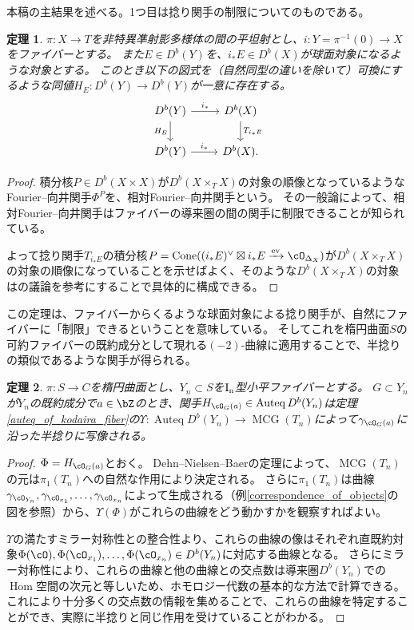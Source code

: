 \documentclass[uplatex,a4paper,dvipdfmx]{jsarticle}
\theoremstyle{plain}
\newtheorem{theorem}{定理}[section]
\theoremstyle{definition}
\DeclareMathOperator{\Hom}{\mathrm{Hom}}
\DeclareMathOperator{\Auteq}{\mathrm{Auteq}}
\DeclareMathOperator{\Cone}{\mathrm{Cone}}
\DeclareMathOperator{\ev}{\mathrm{ev}}
\DeclareMathOperator{\MCG}{\mathrm{MCG}}
\begin{document}
本稿の主結果を述べる。1つ目は捻り関手の制限についてのものである。
\begin{theorem}
	$\pi \colon X \to T$を非特異凖射影多様体の間の平坦射とし、$i \colon Y = \pi^{-1}(0) \to X$をファイバーとする。
	また$E \in D^b(Y)$を、$i_*E \in D^b(X)$が球面対象になるような対象とする。
	このとき以下の図式を（自然同型の違いを除いて）可換にするような同値$H_E \colon D^b(Y) \to D^b(Y)$が一意に存在する。
	\begin{equation}
		\begin{tikzcd}
			D^b(Y) \arrow[r,"i_*"]\arrow[d, "H_E"'] & D^b(X) \arrow[d,"T_{i_*E}"]\\
			D^b(Y) \arrow[r, "i_*"]& D^b(X).
		\end{tikzcd}
	\end{equation}
\end{theorem}
\begin{proof}
	積分核$P \in D^b(X \times X)$が$D^b(X \times_T X)$の対象の順像となっているようなFourier--向井関手$\Phi^P$を、相対Fourier--向井関手という。
	その一般論によって、相対Fourier--向井関手はファイバーの導来圏の間の関手に制限できることが知られている。

	よって捻り関手$T_{i_*E}$の積分核$P = \Cone((i_*E)^\vee \boxtimes i_*E \xrightarrow{\ev} \cO_{\Delta_X})$が$D^b(X \times_T X)$の対象の順像になっていることを示せばよく、そのような$D^b(X \times_T X)$の対象は\cite{MR2200048}の議論を参考にすることで具体的に構成できる。
\end{proof}
この定理は、ファイバーからくるような球面対象による捻り関手が、自然にファイバーに「制限」できるということを意味している。
そしてこれを楕円曲面$S$の可約ファイバーの既約成分として現れる$(-2)$-曲線に適用することで、半捻りの類似であるような関手が得られる。
\begin{theorem}
	$\pi \colon S \to C$を楕円曲面とし、$Y_n \subset S$を$\rm{I}_n$型小平ファイバーとする。
	$G \subset Y_n$が$Y_n$の既約成分で$a \in \bZ$のとき、関手$H_{\cO_G(a)} \in \Auteq D^b(Y_n)$は定理\ref{auteq_of_kodaira_fiber}の$\Upsilon \colon \Auteq D^b(Y_n) \to \MCG(T_n)$によって$\gamma_{\cO_G(a)}$に沿った半捻りに写像される。
\end{theorem}
\begin{proof}
	$\Phi = H_{\cO_G(a)}$とおく。
	Dehn--Nielsen--Baerの定理によって、$\MCG(T_n)$の元は$\pi_1(T_n)$への自然な作用により決定される。
	さらに$\pi_1(T_n)$は曲線$\gamma_{\cO_{Y_n}}, \gamma_{\cO_{x_1}}, \dots, \gamma_{\cO_{x_n}}$によって生成される（例\ref{correspondence_of_objects}の図を参照）から、$\Upsilon(\Phi)$がこれらの曲線をどう動かすかを観察すればよい。

	$\Upsilon$の満たすミラー対称性との整合性より、これらの曲線の像はそれぞれ直既約対象$\Phi(\cO), \Phi(\cO_{x_1}), \dots, \Phi(\cO_{x_n}) \in D^b(Y_n)$に対応する曲線となる。
	さらにミラー対称性により、これらの曲線と他の曲線との交点数は導来圏$D^b(Y_n)$での$\Hom$空間の次元と等しいため、ホモロジー代数の基本的な方法で計算できる。
	これにより十分多くの交点数の情報を集めることで、これらの曲線を特定することができ、実際に半捻りと同じ作用を受けていることがわかる。
\end{proof}
\end{document}
